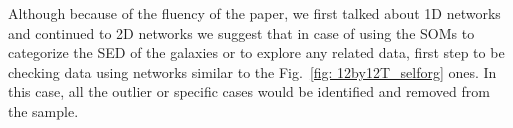     Although because of the fluency of the paper, we first talked about 1D networks and continued to 2D networks we suggest that in case of using the SOMs to categorize the SED of the galaxies or to explore any related data, first step to be checking data using networks similar to the Fig.~\ref{fig: 12by12T_selforg} ones.
    In this case, all the outlier or specific cases would be identified and removed from the sample. 

    
    
    